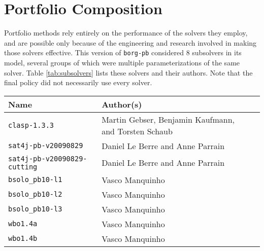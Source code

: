 \section{\label{sec:subsolvers}Portfolio Composition}

Portfolio methods rely entirely on the performance of the solvers they employ,
and are possible only because of the engineering and research involved in
making those solvers effective. This version of {\tt borg-pb} considered 8
subsolvers in its model, several groups of which were multiple
parameterizations of the same solver.  Table \ref{tab:subsolvers} lists these
solvers and their authors. Note that the final policy did not necessarily use
every solver.
\begin{table*}
\begin{center}
\begin{tabular}{lll}
\toprule
{\bf Name}                       & {\bf Author(s)}\\
\midrule
{\tt clasp-1.3.3}                & Martin Gebser, Benjamin Kaufmann, and Torsten Schaub\\
{\tt sat4j-pb-v20090829}         & Daniel Le Berre and Anne Parrain\\
{\tt sat4j-pb-v20090829-cutting} & Daniel Le Berre and Anne Parrain\\
{\tt bsolo\_pb10-l1}             & Vasco Manquinho\\
{\tt bsolo\_pb10-l2}             & Vasco Manquinho\\
{\tt bsolo\_pb10-l3}             & Vasco Manquinho\\
{\tt wbo1.4a}                    & Vasco Manquinho\\
{\tt wbo1.4b}                    & Vasco Manquinho\\
\bottomrule
\end{tabular}
\caption{\label{tab:subsolvers}Subsolvers considered by {\tt
borg-pb-10.05.30}.}
\end{center}
\end{table*}

